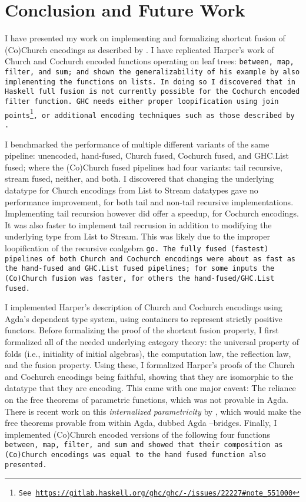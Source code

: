 \section{Conclusion and Future Work}\label{sec:conclusion}
I have presented my work on implementing and formalizing shortcut fusion of (Co)Church encodings as described by \cite{Harper2011}.
I have replicated Harper's work of Church and Cochurch encoded functions operating on leaf trees: \tt{between}, \tt{map}, \tt{filter}, and \tt{sum};  and shown the generalizability of his example by also implementing the functions on lists.
In doing so I discovered that in Haskell full fusion is not currently possible for the Cochurch encoded filter function.
GHC needs either proper loopification using join points\footnote{See \url{https://gitlab.haskell.org/ghc/ghc/-/issues/22227\#note_551000}}, or additional encoding techniques such as those described by \cite{Coutts2007}.

I benchmarked the performance of multiple different variants of the same pipeline: unencoded, hand-fused, Church fused, Cochurch fused, and GHC.List fused; where the (Co)Church fused pipelines had four variants: tail recursive, stream fused, neither, and both.
I discovered that changing the underlying datatype for Church encodings from List to Stream datatypes gave no performance improvement, for both tail and non-tail recursive implementations. Implementing tail recursion however did offer a speedup, for Cochurch encodings.
It was also faster to implement tail recrusion in addition to modifying the underlying type from List to Stream.
This was likely due to the improper loopification of the recursive coalgebra \tt{go}.
The fully fused (fastest) pipelines of both Church and Cochurch encodings were about as fast as the hand-fused and GHC.List fused pipelines; for some inputs the (Co)Church fusion was faster, for others the hand-fused/GHC.List fused.

I implemented Harper's description of Church and Cochurch encodings using Agda's dependent type system, using containers to represent strictly positive functors.
Before formalizing the proof of the shortcut fusion property, I first formalized all of the needed underlying category theory: the universal property of folds (i.e., initiality of initial algebras), the computation law, the reflection law, and the fusion property.
Using these, I formalized Harper's proofs of the Church and Cochurch encodings being faithful, showing that they are isomorphic to the datatype that they are encoding.
This came with one major caveat: The reliance on the free theorems of parametric functions, which was not provable in Agda.
There is recent work on this \textit{internalized parametricity} by \cite{Muylder2024}, which would make the free theorems provable from within Agda, dubbed Agda --bridges.
Finally, I implemented (Co)Church encoded versions of the following four functions \tt{between}, \tt{map}, \tt{filter}, and \tt{sum} and showed that their composition as (Co)Church encodings was equal to the hand fused function also presented.

